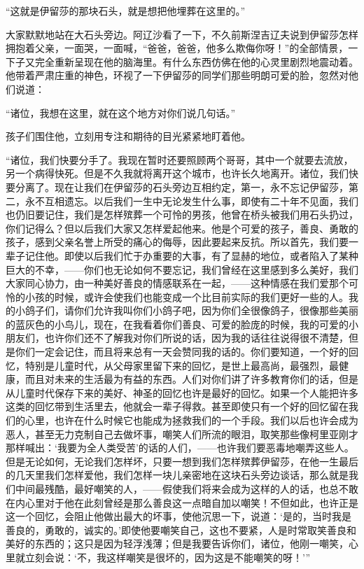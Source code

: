 \par “这就是伊留莎的那块石头，就是想把他埋葬在这里的。”
\par 大家默默地站在大石头旁边。阿辽沙看了一下，不久前斯涅吉辽夫说到伊留莎怎样拥抱着父亲，一面哭，一面喊，“爸爸，爸爸，他多么欺侮你呀！”的全部情景，一下子又完全重新呈现在他的脑海里。有什么东西仿佛在他的心灵里剧烈地震动着。他带着严肃庄重的神色，环视了一下伊留莎的同学们那些明朗可爱的脸，忽然对他们说道：
\par “诸位，我想在这里，就在这个地方对你们说几句话。”
\par 孩子们围住他，立刻用专注和期待的目光紧紧地盯着他。
\par “诸位，我们快要分手了。我现在暂时还要照顾两个哥哥，其中一个就要去流放，另一个病得快死。但是不久我就将离开这个城市，也许长久地离开。诸位，我们快要分离了。现在让我们在伊留莎的石头旁边互相约定，第一，永不忘记伊留莎，第二，永不互相遗忘。以后我们一生中无论发生什么事，即使有二十年不见面，我们也仍旧要记住，我们是怎样殡葬一个可怜的男孩，他曾在桥头被我们用石头扔过，你们记得么？但以后我们大家又怎样爱起他来。他是个可爱的孩子，善良、勇敢的孩子，感到父亲名誉上所受的痛心的侮辱，因此要起来反抗。所以首先，我们要一辈子记住他。即使以后我们忙于办重要的大事，有了显赫的地位，或者陷入了某种巨大的不幸，——你们也无论如何不要忘记，我们曾经在这里感到多么美好，我们大家同心协力，由一种美好善良的情感联系在一起，——这种情感在我们爱那个可怜的小孩的时候，或许会使我们也能变成一个比目前实际的我们更好一些的人。我的小鸽子们，请你们允许我叫你们小鸽子吧，因为你们全很像鸽子，很像那些美丽的蓝灰色的小鸟儿，现在，在我看着你们善良、可爱的脸庞的时候，我的可爱的小朋友们，也许你们还不了解我对你们所说的话，因为我的话往往说得很不清楚，但是你们一定会记住，而且将来总有一天会赞同我的话的。你们要知道，一个好的回忆，特别是儿童时代，从父母家里留下来的回忆，是世上最高尚，最强烈，最健康，而且对未来的生活最为有益的东西。人们对你们讲了许多教育你们的话，但是从儿童时代保存下来的美好、神圣的回忆也许是最好的回忆。如果一个人能把许多这类的回忆带到生活里去，他就会一辈子得救。甚至即使只有一个好的回忆留在我们的心里，也许在什么时候它也能成为拯救我们的一个手段。我们以后也许会成为恶人，甚至无力克制自己去做坏事，嘲笑人们所流的眼泪，取笑那些像柯里亚刚才那样喊出：‘我要为全人类受苦’的话的人们，——也许我们要恶毒地嘲弄这些人。但是无论如何，无论我们怎样坏，只要一想到我们怎样殡葬伊留莎，在他一生最后的几天里我们怎样爱他，我们怎样一块儿亲密地在这块石头旁边谈话，那么就是我们中间最残酷，最好嘲笑的人，——假使我们将来会成为这样的人的话，也总不敢在内心里对于他在此刻曾经是那么善良这一点暗自加以嘲笑！不但如此，也许正是这一个回忆，会阻止他做出最大的坏事，使他沉思一下，说道：‘是的，当时我是善良的，勇敢的，诚实的。’即使他要嘲笑自己，这也不要紧，人是时常取笑善良和美好的东西的；这只是因为轻浮浅薄；但是我要告诉你们，诸位，他刚一嘲笑，心里就立刻会说：‘不，我这样嘲笑是很坏的，因为这是不能嘲笑的呀！’”
